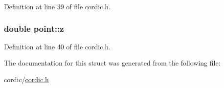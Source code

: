 Definition at line 39 of file cordic.\-h.

\hypertarget{structpoint_aab1f0c3682401083b5bf252e7001874f}{
\subsubsection[{z}]{\setlength{\rightskip}{0pt plus 5cm}double point\-::z}}\label{structpoint_aab1f0c3682401083b5bf252e7001874f}


Definition at line 40 of file cordic.\-h.



The documentation for this struct was generated from the following file\-:\begin{DoxyCompactItemize}
\item 
cordic/\hyperlink{cordic_8h}{cordic.\-h}\end{DoxyCompactItemize}
